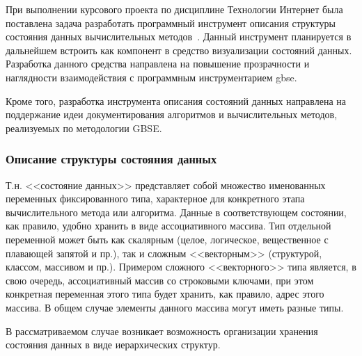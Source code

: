 \def\notedate{2022.05.17}
\def\currentauthor{Тришин И.В., Соколов А.П.}

При выполнении курсового проекта по дисциплине \flqq Технологии Интернет\frqq\xspace была поставлена задача разработать программный инструмент описания структуры состояния данных вычислительных методов~\cite{SokolovPershin2018}. Данный инструмент планируется в дальнейшем встроить как компонент в средство визуализации состояний данных. Разработка данного средства направлена на повышение прозрачности и наглядности взаимодействия с программным инструментарием \gls{gbse}.

Кроме того, разработка инструмента описания состояний данных направлена на поддержание идеи документирования алгоритмов и вычислительных методов, реализуемых по методологии GBSE.

\subsubsection{Описание структуры состояния данных}

Т.н. <<состояние данных>>\cite{SokolovPershin2018} представляет собой множество именованных переменных фиксированного типа, характерное для конкретного этапа вычислительного метода или алгоритма. Данные в соответствующем состоянии, как правило, удобно хранить в виде ассоциативного массива. Тип отдельной переменной может быть как скалярным (целое, логическое, вещественное с плавающей запятой и пр.), так и сложным <<векторным>> (структурой, классом, массивом и пр.). Примером сложного <<векторного>> типа является, в свою очередь, ассоциативный массив со строковыми ключами, при этом конкретная переменная этого типа будет хранить, как правило, адрес этого массива. В общем случае элементы данного массива могут иметь разные типы. 

В рассматриваемом случае возникает возможность организации хранения состояния данных в виде иерархических структур.


